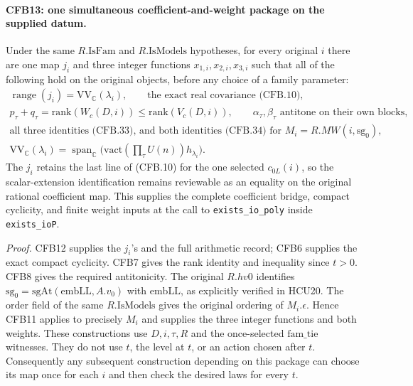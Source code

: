 \paragraph{CFB13: one simultaneous coefficient-and-weight package on the supplied datum.}
\label{claim:CFB13}
Under the same \(R.\mathrm{IsFam}\) and \(R.\mathrm{IsModels}\)
hypotheses, for every original \(i\) there are one map \(j_i\)
and three integer functions \(x_{1,i},x_{2,i},x_{3,i}\) such that
all of the following hold on the original objects, before any
choice of a family parameter:
\[
 \begin{gathered}
 \operatorname{range}(j_i)=\mathrm{VV}_{\mathbb C}(\lambda_i),
 \qquad\text{the exact real covariance (CFB.10)},\\
 p_\tau+q_\tau=\mathrm{rank}(W_c(D,i))
          \le\mathrm{rank}(V_c(D,i)),\qquad
 \alpha_\tau,\beta_\tau\text{ antitone on their own blocks},\\
 \text{all three identities (CFB.33), and both identities (CFB.34)
 for }M_i=R.MW(i,\mathrm{sg}_0),\\
 \mathrm{VV}_{\mathbb C}(\lambda_i)
      =\operatorname{span}_{\mathbb C}
          \bigl(\mathrm{vact}(\prod_\tau U(n))h_{\lambda_i}\bigr).
 \end{gathered}                                                 \tag{CFB.38}
\]
The \(j_i\) retains the last line of (CFB.10) for the one selected
\(c_{0L}(i)\), so the scalar-extension identification remains
reviewable as an equality on the original rational coefficient map.
This supplies the complete coefficient bridge, compact cyclicity,
and finite weight inputs at the call to
\texttt{exists\_io\_poly} inside \texttt{exists\_ioP}.

\emph{Proof.}
CFB12 supplies the \(j_i\)'s and the full arithmetic record;
CFB6 supplies the exact compact cyclicity.  CFB7 gives the rank
identity and inequality since \(t>0\).  CFB8 gives the required
antitonicity.  The original \(R.hv0\) identifies
\(\mathrm{sg}_0=\mathrm{sgAt}(\mathrm{embLL},A.v_0)\) with
\(\mathrm{embLL}\), as explicitly verified in HCU20.
The \(\mathrm{order}\) field of the same
\(R.\mathrm{IsModels}\) gives the original ordering of
\(M_i.\epsilon\).  Hence CFB11 applies to precisely \(M_i\)
and supplies the three integer functions and both weights.
These constructions use \(D,i,\tau,R\) and the once-selected
\(\mathrm{fam\_tie}\) witnesses.  They do not use \(t\),
the level at \(t\), or an action chosen after \(t\).
Consequently any subsequent construction depending on this
package can choose its map once for each \(i\) and then check
the desired laws for every \(t\).

